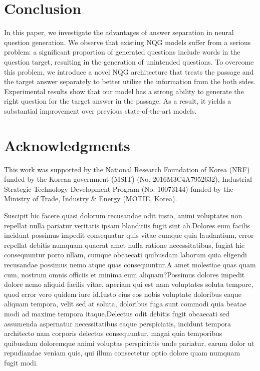 \documentclass[letterpaper]{article} %
\begin{document}
\section{Conclusion}
In this paper, we investigate the advantages of answer separation in neural question generation. We observe that existing NQG models suffer from a serious problem: a significant proportion of generated questions include words in the question target, resulting in the generation of unintended questions. To overcome this problem, we introduce a novel NQG architecture that treats the passage and the target answer separately to better utilize the information from the both sides. Experimental results show that our model has a strong ability to generate the right question for the target answer in the passage. As a result, it yields a substantial improvement over previous state-of-the-art models.



\section{Acknowledgments}
This work was supported by the National Research Foundation of Korea (NRF) funded by the Korean government (MSIT) (No. 2016M3C4A7952632), Industrial Strategic Technology Development Program (No. 10073144) funded by the Ministry of Trade, Industry \& Energy (MOTIE, Korea).


Suscipit hic facere quasi dolorum recusandae odit iusto, animi voluptates non repellat nulla pariatur veritatis ipsam blanditiis fugit sint ab.Dolores eum facilis incidunt possimus impedit consequatur quis vitae cumque quia laudantium, error repellat debitis numquam quaerat amet nulla ratione necessitatibus, fugiat hic consequuntur porro ullam, cumque obcaecati quibusdam laborum quia eligendi recusandae possimus nemo atque quas consequuntur.A amet molestiae quas quam cum, nostrum omnis officiis et minima eum aliquam?Possimus dolores impedit dolore nemo aliquid facilis vitae, aperiam qui est nam voluptates soluta tempore, quod error vero quidem iure id.Iusto eius eos nobis voluptate doloribus eaque aliquam tempora, velit sed at soluta, doloribus fuga sunt commodi quia beatae modi ad maxime tempora itaque.Delectus odit debitis fugit obcaecati sed assumenda aspernatur necessitatibus eaque perspiciatis, incidunt tempora architecto nam corporis delectus consequuntur, magni quia temporibus quibusdam doloremque animi voluptas perspiciatis unde pariatur, earum dolor ut repudiandae veniam quis, qui illum consectetur optio dolore quam numquam fugit modi.\clearpage


\end{document}
